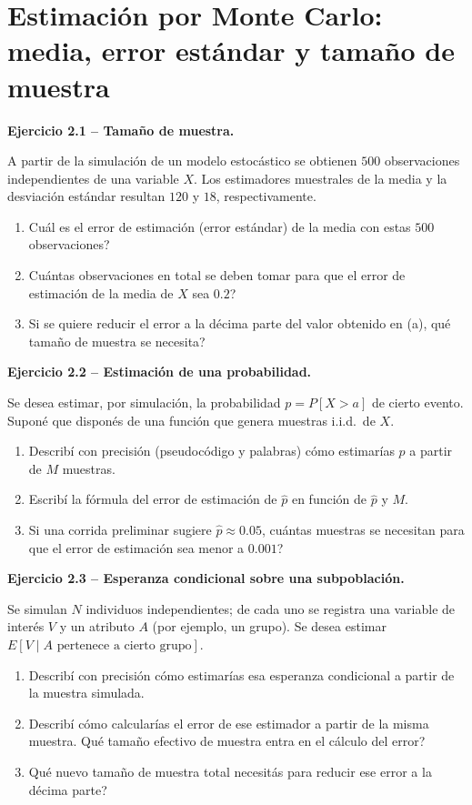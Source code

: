\documentclass[11pt,a4paper]{article}
\newcommand{\ejercicio}[1]{\par\medskip\noindent\textbf{#1}\par\nopagebreak\smallskip}
\begin{document}
\section{Estimaci\'on por Monte Carlo: media, error est\'andar y tama\~no de muestra}

\ejercicio{Ejercicio 2.1 -- Tama\~no de muestra.}
A partir de la simulaci\'on de un modelo estoc\'astico se obtienen $500$
observaciones independientes de una variable $X$. Los estimadores muestrales de
la media y la desviaci\'on est\'andar resultan $120$ y $18$, respectivamente.
\begin{enumerate}[label=(\alph*)]
  \item \textquestiondown{}Cu\'al es el error de estimaci\'on (error est\'andar) de la media con estas
        $500$ observaciones?
  \item \textquestiondown{}Cu\'antas observaciones en total se deben tomar para que el error de
        estimaci\'on de la media de $X$ sea $0.2$?
  \item Si se quiere reducir el error a la d\'ecima parte del valor obtenido en (a),
        \textquestiondown{}qu\'e tama\~no de muestra se necesita?
\end{enumerate}

\ejercicio{Ejercicio 2.2 -- Estimaci\'on de una probabilidad.}
Se desea estimar, por simulaci\'on, la probabilidad $p=P[X>a]$ de cierto evento.
Supon\'e que dispon\'es de una funci\'on que genera muestras i.i.d.\ de $X$.
\begin{enumerate}[label=(\alph*)]
  \item Describ\'i con precisi\'on (pseudoc\'odigo y palabras) c\'omo estimar\'ias $p$ a
        partir de $M$ muestras.
  \item Escrib\'i la f\'ormula del error de estimaci\'on de $\hat p$ en funci\'on de
        $\hat p$ y $M$.
  \item Si una corrida preliminar sugiere $\hat p\approx 0.05$, \textquestiondown{}cu\'antas muestras
        se necesitan para que el error de estimaci\'on sea menor a $0.001$?
\end{enumerate}

\ejercicio{Ejercicio 2.3 -- Esperanza condicional sobre una subpoblaci\'on.}
Se simulan $N$ individuos independientes; de cada uno se registra una variable de
inter\'es $V$ y un atributo $A$ (por ejemplo, un grupo). Se desea estimar
$E[V \mid A \text{ pertenece a cierto grupo}]$.
\begin{enumerate}[label=(\alph*)]
  \item Describ\'i con precisi\'on c\'omo estimar\'ias esa esperanza condicional a partir
        de la muestra simulada.
  \item Describ\'i c\'omo calcular\'ias el error de ese estimador a partir de la misma
        muestra. \textquestiondown{}Qu\'e tama\~no efectivo de muestra entra en el c\'alculo del error?
  \item \textquestiondown{}Qu\'e nuevo tama\~no de muestra total necesit\'as para reducir ese error a la
        d\'ecima parte?
\end{enumerate}
\end{document}
